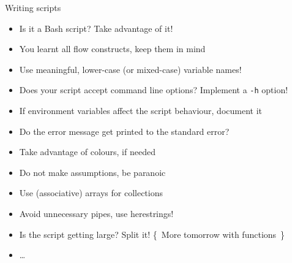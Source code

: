 
\begin{frame}{Writing scripts}
    \begin{itemize}
        \item Is it a Bash script? Take advantage of it!
        \item You learnt all flow constructs, keep them in mind
        \item Use meaningful, lower-case (or mixed-case) variable names!
        \item Does your script accept command line options? Implement a \texttt{-h} option!
        \item If environment variables affect the script behaviour, document it
        \item Do the error message get printed to the standard error?
        \item Take advantage of colours, if needed
        \item Do not make assumptions, be paranoic
        \item Use (associative) arrays for collections
        \item Avoid unnecessary pipes, use herestrings!
        \item Is the script getting large? Split it! {\tiny\{~More tomorrow with functions~\}}
        \item \ldots
    \end{itemize}
\end{frame}
